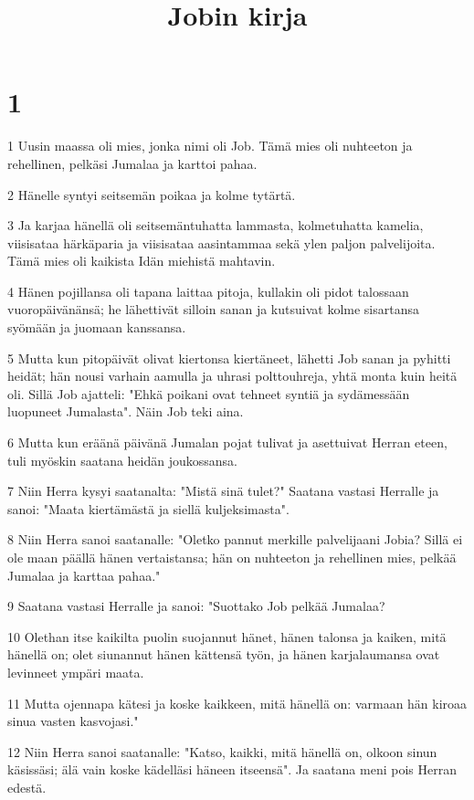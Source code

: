

\title{Jobin kirja}


\chapter{1}

\par 1 Uusin maassa oli mies, jonka nimi oli Job. Tämä mies oli nuhteeton ja rehellinen, pelkäsi Jumalaa ja karttoi pahaa.
\par 2 Hänelle syntyi seitsemän poikaa ja kolme tytärtä.
\par 3 Ja karjaa hänellä oli seitsemäntuhatta lammasta, kolmetuhatta kamelia, viisisataa härkäparia ja viisisataa aasintammaa sekä ylen paljon palvelijoita. Tämä mies oli kaikista Idän miehistä mahtavin.
\par 4 Hänen pojillansa oli tapana laittaa pitoja, kullakin oli pidot talossaan vuoropäivänänsä; he lähettivät silloin sanan ja kutsuivat kolme sisartansa syömään ja juomaan kanssansa.
\par 5 Mutta kun pitopäivät olivat kiertonsa kiertäneet, lähetti Job sanan ja pyhitti heidät; hän nousi varhain aamulla ja uhrasi polttouhreja, yhtä monta kuin heitä oli. Sillä Job ajatteli: "Ehkä poikani ovat tehneet syntiä ja sydämessään luopuneet Jumalasta". Näin Job teki aina.
\par 6 Mutta kun eräänä päivänä Jumalan pojat tulivat ja asettuivat Herran eteen, tuli myöskin saatana heidän joukossansa.
\par 7 Niin Herra kysyi saatanalta: "Mistä sinä tulet?" Saatana vastasi Herralle ja sanoi: "Maata kiertämästä ja siellä kuljeksimasta".
\par 8 Niin Herra sanoi saatanalle: "Oletko pannut merkille palvelijaani Jobia? Sillä ei ole maan päällä hänen vertaistansa; hän on nuhteeton ja rehellinen mies, pelkää Jumalaa ja karttaa pahaa."
\par 9 Saatana vastasi Herralle ja sanoi: "Suottako Job pelkää Jumalaa?
\par 10 Olethan itse kaikilta puolin suojannut hänet, hänen talonsa ja kaiken, mitä hänellä on; olet siunannut hänen kättensä työn, ja hänen karjalaumansa ovat levinneet ympäri maata.
\par 11 Mutta ojennapa kätesi ja koske kaikkeen, mitä hänellä on: varmaan hän kiroaa sinua vasten kasvojasi."
\par 12 Niin Herra sanoi saatanalle: "Katso, kaikki, mitä hänellä on, olkoon sinun käsissäsi; älä vain koske kädelläsi häneen itseensä". Ja saatana meni pois Herran edestä.
